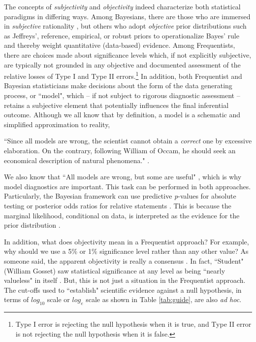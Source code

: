The concepts of \textit{subjectivity} and \textit{objectivity} indeed characterize both statistical paradigms in differing ways. Among Bayesians, there are those who are immersed in \textit{subjective} rationality \cite{Ramsey1926, deFinetti1937, savage1954, Lindley2000}, but others who adopt \textit{objective} prior distributions such as Jeffreys', reference, empirical, or robust priors \cite{Bayes1763, Laplace1812, Jeffreys1961, Berger2006} to operationalize Bayes' rule and thereby weight quantitative (data-based) evidence. Among Frequentists, there are choices made about significance levels which, if not explicitly subjective, are typically not grounded in any objective and documented assessment of the relative losses of Type I and Type II errors.\footnote{Type I error is rejecting the null hypothesis when it is true, and Type II error is not rejecting the null hypothesis when it is false.} In addition, both Frequentist and Bayesian statisticians make decisions about the form of the data generating process, or ``model", which -- if not subject to rigorous diagnostic assessment -- retains a subjective element that potentially influences the final inferential outcome. Although we all know that by definition, a model is a schematic and simplified approximation to reality,

``Since all models are wrong, the scientist cannot obtain a \textit{correct} one by excessive elaboration. On the contrary, following William of Occam, he should seek an economical description of natural phenomena." \cite{Box1976}.

We also know that ``All models are wrong, but some are useful" \cite{box1979robustness}, which is why model diagnostics are important. This task can be performed in both approaches. Particularly, the Bayesian framework can use predictive \textit{p}-values for absolute testing \cite{Gelman1996, Bayarri2000} or posterior odds ratios for relative statements \cite{Jeffreys1935, Kass1995}. This is because the marginal likelihood, conditional on data, is interpreted as the evidence for the prior distribution \cite{berger93}.

In addition, what does objectivity mean in a Frequentist approach? For example, why should we use a 5\% or 1\% significance level rather than any other value? As someone said, the apparent objectivity is really a consensus \cite{Lindley2000}. In fact, ``Student" (William Gosset) saw statistical significance at any level as being ``nearly valueless" in itself \cite{Ziliak2008}. But, this is not just a situation in the Frequentist approach. The cut-offs used to ``establish" scientific evidence against a null hypothesis, in terms of $log_{10}$ scale \cite{Jeffreys1961} or $log_{e}$ scale \cite{Kass1995} as shown in Table \ref{tab:guide}, are also \textit{ad hoc}.

